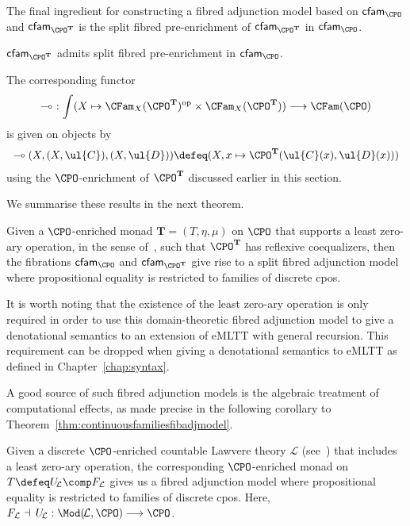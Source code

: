 The final ingredient for constructing a fibred adjunction model based on $\mathsf{cfam}_{\CPO}$ and $\mathsf{cfam}_{\CPO^{\mathbf{T}}}$ is the split fibred pre-enrichment of $\mathsf{cfam}_{\CPO^{\mathbf{T}}}$ in $\mathsf{cfam}_{\CPO}$.

\begin{proposition}
$\mathsf{cfam}_{\CPO^{\mathbf{T}}}$ admits split fibred pre-enrichment in $\mathsf{cfam}_{\CPO}$.
\end{proposition}

The corresponding functor 
\[
\multimap \,\,: \int (X \mapsto \CFam_X({\CPO^{\mathbf{T}}})^{\text{op}} \times \CFam_X({\CPO^{\mathbf{T}}})) \longrightarrow \CFam(\CPO)
\]
is given on objects by 
\[
\begin{array}{c}
\multimap (X,(X,\ul{C}),(X,\ul{D})) \defeq (X,x \mapsto \CPO^{\mathbf{T}}(\ul{C}(x),\ul{D}(x)))
\end{array}
\]
using the $\CPO$-enrichment of $\CPO^{\mathbf{T}}$ discussed earlier in this section.


We summarise these results in the next theorem.

\begin{theorem}
\label{thm:continuousfamiliesfibadjmodel}
Given a $\CPO$-enriched monad $\mathbf{T} = (T,\eta,\mu)$ on $\CPO$ that supports a least zero-ary operation, in the sense of~\cite[Section~6]{Plotkin:SemanticsForAlgOperations}, such that $\CPO^{\mathbf{T}}$ has reflexive coequalizers, then the fibrations $\mathsf{cfam}_{\CPO}$ and $\mathsf{cfam}_{\CPO^{\mathbf{T}}}$ give rise to a split fibred adjunction model where propositional equality is restricted to families of discrete cpos.
\end{theorem}

It is worth noting that the existence of the least zero-ary operation is only required in order to use this domain-theoretic fibred adjunction model to give a denotational semantics to an extension of eMLTT with general recursion. This requirement can be dropped when giving a denotational semantics to eMLTT as defined in Chapter~\ref{chap:syntax}.

A good source of such fibred adjunction models is the algebraic treatment of computational effects, as made precise in the following corollary to Theorem~\ref{thm:continuousfamiliesfibadjmodel}.

\begin{corollary}
\label{cor:fibredadjunctionmodelsfromdiscretelawveretheories}
Given a discrete $\CPO$-enriched countable Lawvere theory $\mathcal{L}$ \linebreak (see~\cite{Hyland:DiscreteLawTh}) that includes a least zero-ary operation, the corresponding $\CPO$-enriched monad on $T \defeq U_{\!\mathcal{L}} \comp F_{\mathcal{L}}$ gives us a fibred adjunction model where propositional equality is restricted to families of discrete cpos. Here, $F_{\mathcal{L}} \dashv\, U_{\!\mathcal{L}} : \Mod(\!\mathcal{L},\CPO) \longrightarrow \CPO$.
\end{corollary}


